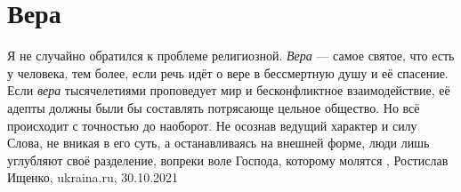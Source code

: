 
 
 
 
 
\chapter{Вера}

Я не случайно обратился к проблеме религиозной. \emph{Вера} — самое святое, что есть у
человека, тем более, если речь идёт о вере в бессмертную душу и её спасение.
Если \emph{вера} тысячелетиями проповедует мир и бесконфликтное взаимодействие, её
адепты должны были бы составлять потрясающе цельное общество. Но всё происходит
с точностью до наоборот. Не осознав ведущий характер и силу Слова, не вникая в
его суть, а останавливаясь на внешней форме, люди лишь углубляют своё
разделение, вопреки воле Господа, которому молятся
, 
Ростислав Ищенко, ukraina.ru, 30.10.2021
